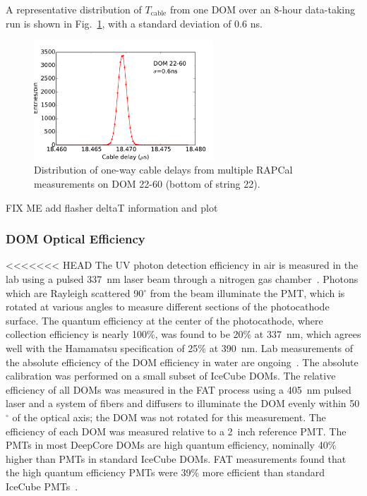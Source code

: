 \noindent A representative distribution of $T_{\mathrm{cable}}$ from one DOM over an 8-hour
data-taking run is shown in Fig.~\ref{fig:rapcal_cable_len}, with a
standard deviation of 0.6 ns.


\begin{figure}[!h]
 \centering
 \includegraphics[width=0.6\textwidth]{graphics/dom/rapcal/tcal_hist_22-60.pdf}
 \caption{Distribution of one-way cable delays from multiple RAPCal
   measurements on DOM 22-60 (bottom of string 22).}
 \label{fig:rapcal_cable_len}
\end{figure}

FIX ME add flasher deltaT information and plot

\subsubsection{\label{sec:domeff} DOM Optical Efficiency}

<<<<<<< HEAD
The UV photon detection efficiency in air is measured in the lab using a
pulsed 337~nm laser beam through a nitrogen gas chamber~\cite{ICECUBE:PMT}. Photons
which are Rayleigh scattered 90$^{\circ}$ from the beam illuminate the PMT,
which is rotated at various angles to measure different sections of
the photocathode surface. The quantum efficiency at the center of the
photocathode, where collection efficiency is nearly 100\%, was found
to be 20\% at 337~nm, which agrees well with the Hamamatsu
specification of 25\% at 390~nm. Lab measurements of the absolute efficiency of the DOM efficiency in water are ongoing~\cite{ICECUBE:DOMEFF}. The absolute calibration was performed on a small subset of IceCube DOMs. The relative efficiency of all DOMs was measured in the FAT process using a 405~nm pulsed laser and a system of fibers and diffusers to illuminate the DOM evenly within 50$^{\circ}$ of the optical axis; the DOM was not rotated for this measurement. The efficiency of each DOM was measured relative to a 2~inch reference PMT. The PMTs in most DeepCore DOMs are high quantum efficiency, nominally 40\% higher than PMTs in standard IceCube DOMs. FAT measurements found that the high quantum efficiency PMTs were 39\% more efficient than standard IceCube PMTs~\cite{ICECUBE:DC}.

